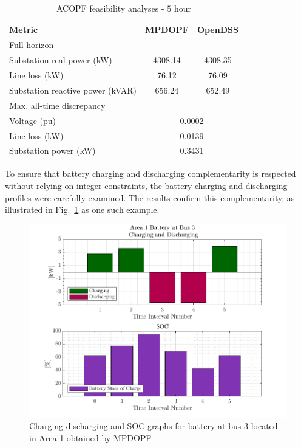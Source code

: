 \begin{table}[H]
    \centering
    \caption{ACOPF feasibility analyses - $5$ hour}
    \begin{tabular}{|l|c|c|}
    \hline
    \textbf{Metric} & \textbf{MPDOPF} & \textbf{OpenDSS} \\ \hline
    Full horizon  & \multicolumn{2}{c|}{} \\ \hline
    \quad Substation real power (kW) & 4308.14 & 4308.35 \\ \hline
    \quad Line loss (kW) & 76.12 & 76.09 \\ \hline
    \quad Substation reactive power (kVAR) & 656.24 & 652.49 \\ \hline
    Max. all-time discrepancy & \multicolumn{2}{c|}{} \\ \hline
    \quad Voltage (pu) & \multicolumn{2}{c|}{0.0002} \\ \hline
    \quad Line loss (kW) & \multicolumn{2}{c|}{0.0139} \\ \hline
    \quad Substation power (kW) & \multicolumn{2}{c|}{0.3431} \\ \hline
    \end{tabular}
    \label{table:feas-5-20-30_enapp}
    \vspace{-3mm}
\end{table}

To ensure that battery charging and discharging complementarity is respected without relying on integer constraints, the battery charging and discharging profiles were carefully examined. The results confirm this complementarity, as illustrated in Fig.~\ref{fig:batt-plot-dopf-5-20-30-genCost_enapp} as one such example.

\begin{figure}[t]
    \centering
    \includegraphics[width=\linewidth]{figures/T5-pv20-batt30-genCost/dopf/BatteryPlots/macroItr_5_genCost_Battery_1_alpha_0.001.png}
    \vspace{-5mm}
    \caption{Charging-discharging and SOC graphs for battery at bus 3 located in Area 1 obtained by MPDOPF}
    \label{fig:batt-plot-dopf-5-20-30-genCost_enapp}
    \vspace{-3mm}
\end{figure}

